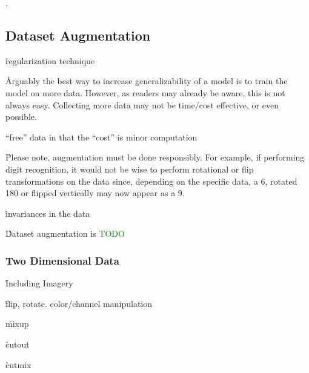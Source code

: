 .


\subsection{Dataset Augmentation}

\r{regularization technique}

\r{Arguably the best way to increase generalizability of a model is to train the model on more data. However, as readers may already be aware, this is not always easy. Collecting more data may not be time/cost effective, or even possible.}

\r{``free'' data in that the ``cost'' is minor computation}

\r{Please note, augmentation must be done responsibly. For example, if performing digit recognition, it would not be wise to perform rotational or flip transformations on the data since, depending on the specific data, a 6, rotated 180 or flipped vertically may now appear as a 9.}


\r{invariances in the data}


\r{Dataset augmentation is \textcolor{green}{TODO}}




\subsubsection{Two Dimensional Data}

\r{Including Imagery}

\r{flip, rotate. color/channel manipulation}

\r{mixup\cite{zhang2017mixup}}

\r{cutout\cite{devries2017improved}}

\r{cutmix\cite{yun2019cutmix}}




